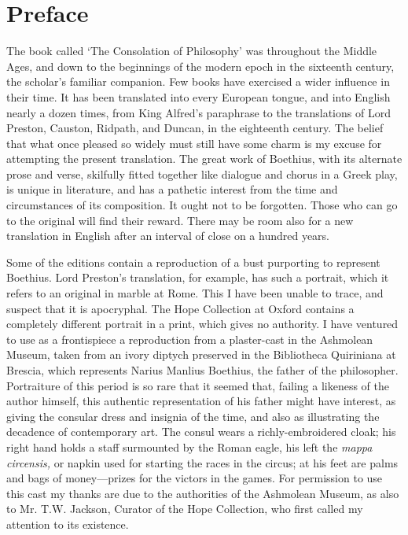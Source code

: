 \documentclass[11pt]{book}
\begin{document}
\vfill
\pagebreak


\chapter{Preface}

The book called `The Consolation of Philosophy' was \linebreak throughout the
Middle Ages, and down to the beginnings of the modern epoch in the
sixteenth century, the scholar's familiar companion. Few books have
exercised a wider influence in their time. It has been translated into
every European tongue, and into English nearly a dozen times, from King
Alfred's paraphrase to the translations of Lord Preston, Causton,
Ridpath, and Duncan, in the eighteenth century. The belief that what
once pleased so widely must still have some charm is my excuse for
attempting the present translation. The great work of Boethius, with its
alternate prose and verse, skilfully fitted together like dialogue and
chorus in a Greek play, is unique in literature, and has a pathetic
interest from the time and circumstances of its composition. It ought
not to be forgotten. Those who can go to the original will find their
reward. There may be room also for a new translation in English after an
interval of close on a hundred years.

\label{diptych}
Some of the editions contain a reproduction of a bust purporting to
represent Boethius. Lord Preston's translation, for example, has such a
portrait, which it refers to an original in marble at Rome. This I have
been unable to trace, and suspect that it is apocryphal. The Hope
Collection at Oxford contains a completely different portrait in a
print, which gives no authority. I have ventured to use as a
frontispiece a reproduction from a plaster-cast in the Ashmolean Museum,
taken from an ivory diptych preserved in the Bibliotheca Quiriniana at
Brescia, which represents Narius Manlius Boethius, the father of the
philosopher. Portraiture of this period is so rare that it seemed that,
failing a likeness of the author himself, this authentic representation
of his father might have interest, as giving the consular dress and
insignia of the time, and also as illustrating the decadence of
contemporary art. The consul wears a richly-embroidered cloak; his right
hand holds a staff surmounted by the Roman eagle, his left the \emph{mappa
circensis,} or napkin used for starting the races in the circus; at his
feet are palms and bags of money---prizes for the victors in the games.
For permission to use this cast my thanks are due to the authorities of
the Ashmolean Museum, as also to Mr. T.W. Jackson, Curator of the Hope
Collection, who first called my attention to its existence.
\end{document}
